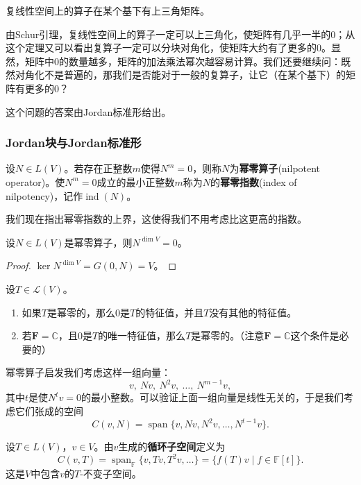 \begin{claim}[Schur引理]
    复线性空间上的算子在某个基下有上三角矩阵。
\end{claim}

由Schur引理，复线性空间上的算子一定可以上三角化，使矩阵有几乎一半的0；从这个定理又可以看出复算子一定可以分块对角化，使矩阵大约有了更多的$0$。显然，矩阵中0的数量越多，矩阵的加法乘法幂次越容易计算。我们还要继续问：既然对角化不是普遍的，那我们是否能对于一般的复算子，让它（在某个基下）的矩阵有更多的0？

这个问题的答案由Jordan标准形给出。

\subsubsection{Jordan块与Jordan标准形}
\begin{definition}[幂零算子]
    设$N \in L(V)$。若存在正整数$m$使得$N^m = 0$，则称$N$为\textbf{幂零算子}(nilpotent operator)。使$N^m = 0$成立的最小正整数$m$称为$N$的\textbf{幂零指数}(index of nilpotency)，记作$\operatorname{ind}(N)$。
\end{definition}

我们现在指出幂零指数的上界，这使得我们不用考虑比这更高的指数。

\begin{theorem}[幂零指数的上界]
    设$N \in L(V)$是幂零算子，则$N^{\dim V}=0$。
\end{theorem}

\begin{proof}
    $\ker N^{\dim V}=G(0, N)=V$。
\end{proof}
\begin{theorem}[幂零算子的特征值]
    设$T \in \mathcal{L}(V)$。
    \begin{enumerate}
        \item[1.] 如果$T$是幂零的，那么$0$是$T$的特征值，并且$T$没有其他的特征值。
        \item[2.] 若$\mathbf{F} = \mathbb{C}$，且$0$是$T$的唯一特征值，那么$T$是幂零的。（注意$\mathbf{F} = \mathbb{C}$这个条件是必要的）
    \end{enumerate}
\end{theorem}

幂零算子启发我们考虑这样一组向量：
\begin{equation}
    v,\ Nv,\ N^2v,\ \ldots,\ N^{m-1}v,
\end{equation}
其中$t$是使$N^t v=0$的最小整数。可以验证上面一组向量是线性无关的，于是我们考虑它们张成的空间
\begin{equation}
    C(v,N)=\operatorname{span}\{v,Nv,N^2v,\ldots,N^{t-1}v\}.
\end{equation}
\begin{definition}[循环子空间与循环模]
    设$T \in L(V)$，$v \in V$。由$v$生成的\textbf{循环子空间}定义为
    \begin{equation}
        C(v, T) = \operatorname{span}_{\mathbb{F}}\{v, Tv, T^2v, \ldots\} = \{f(T)v \mid f \in \mathbb{F}[t]\}.
    \end{equation}
    这是$V$中包含$v$的$T$-不变子空间。
\end{definition}

